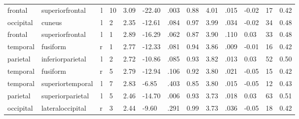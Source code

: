 \documentclass{article}
\begin{document}
\begin{longtable}{llrR{1.3cm}R{1cm}R{1.3cm}R{1cm}R{1cm}R{1.3cm}R{1cm}R{1.8cm}R{1.3cm}R{1.8cm}}
   frontal &           superiorfrontal &    l &        10 &                  3.09 &           -22.40 &               .003 &                               0.88 &                          4.01 &                            .015 &  -0.02 &     17 &      0.42 \\
 occipital &                    cuneus &    l &         2 &                  2.35 &           -12.61 &               .084 &                               0.97 &                          3.99 &                            .034 &  -0.02 &     34 &      0.48 \\
   frontal &           superiorfrontal &    l &         1 &                  2.89 &           -16.29 &               .062 &                               0.87 &                          3.90 &                            .110 &   0.03 &     33 &      0.48 \\
  temporal &                  fusiform &    r &         1 &                  2.77 &           -12.33 &               .081 &                               0.94 &                          3.86 &                            .009 &  -0.01 &     16 &      0.42 \\
  parietal &          inferiorparietal &    l &         2 &                  2.72 &           -10.86 &               .085 &                               0.93 &                          3.82 &                            .013 &   0.03 &     52 &      0.50 \\
  temporal &                  fusiform &    r &         5 &                  2.79 &           -12.94 &               .106 &                               0.92 &                          3.80 &                            .021 &  -0.05 &     15 &      0.42 \\
  temporal &          superiortemporal &    l &         7 &                  2.83 &            -6.85 &               .403 &                               0.85 &                          3.80 &                            .015 &  -0.05 &     12 &      0.43 \\
  parietal &          superiorparietal &    l &         5 &                  2.46 &           -14.70 &               .006 &                               0.93 &                          3.73 &                            .018 &   0.03 &     63 &      0.51 \\
 occipital &          lateraloccipital &    r &         3 &                  2.44 &            -9.60 &               .291 &                               0.99 &                          3.73 &                            .036 &  -0.05 &     18 &      0.42 \\

\end{longtable}
\end{document}
